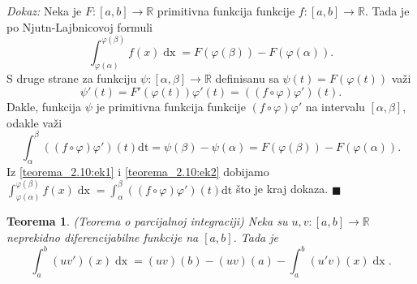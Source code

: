 \documentclass{article}
\newtheorem{teorema}{Teorema}[section]
\DeclareMathOperator{\dx}{dx}
\begin{document}
\textit{Dokaz:} Neka je $F:\left[a,b\right]\longrightarrow \mathbb{R}$ primitivna funkcija funkcije $f:\left[a,b\right]\longrightarrow\mathbb{R}$. Tada je po Njutn-Lajbnicovoj formuli
\begin{equation}
    \label{teorema_2.10:ek1}
    \displaystyle\int^{\varphi\left(\beta\right)}_{\varphi\left(\alpha\right)}f\left(x\right)\dx = F\left(\varphi\left(\beta\right)\right)-F\left(\varphi\left(\alpha\right)\right).
\end{equation}
S druge strane za funkciju $\psi:\left[\alpha,\beta\right]\longrightarrow\mathbb{R}$ definisanu sa $\psi\left(t\right) = F\left(\varphi\left(t\right)\right)$ važi
\begin{equation*}
    \psi'\left(t\right) = F'\left(\varphi\left(t\right)\right)\varphi'\left(t\right) = \left(\left(f\circ\varphi\right)\varphi'\right)\left(t\right).
\end{equation*}
Dakle, funkcija $\psi$ je primitivna funkcija funkcije $\left(f\circ\varphi\right)\varphi'$ na intervalu $\left[\alpha,\beta\right]$, odakle važi
\begin{equation}
    \label{teorema_2.10:ek2}
    \displaystyle\int^\beta_\alpha \left(\left(f\circ\varphi\right)\varphi'\right)\left(t\right)\text{dt} = \psi\left(\beta\right) - \psi\left(\alpha\right) = F\left(\varphi\left(\beta\right)\right) - F\left(\varphi\left(\alpha\right)\right).
\end{equation}
Iz \eqref{teorema_2.10:ek1} i \eqref{teorema_2.10:ek2} dobijamo $\displaystyle\int^{\varphi\left(\beta\right)}_{\varphi\left(\alpha\right)} f\left(x\right)\dx = \int^\beta_\alpha \left(\left(f\circ\varphi\right)\varphi'\right)\left(t\right)\text{dt}$ što je kraj dokaza.
\null\hfill $\blacksquare$\par

\begin{teoremabox}
    \label{teorema_2.11}
    \begin{teorema}
        (Teorema o parcijalnoj integraciji) Neka su $u, v: \left[a, b\right] \longrightarrow\mathbb{R}$ neprekidno diferencijabilne funkcije na $\left[a,b\right]$. Tada je
        $$\displaystyle\int^b_a\left(uv'\right)\left(x\right)\dx = \left(uv\right)\left(b\right) - \left(uv\right)\left(a\right) - \int^b_a\left(u'v\right)\left(x\right)\dx.$$
    \end{teorema}
\end{teoremabox}
\end{document}
